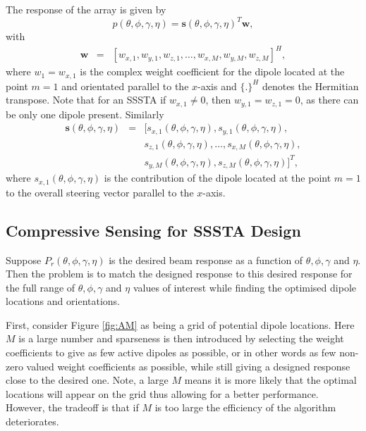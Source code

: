 \documentclass[10pt,final]{IEEEtran}
\begin{document}
 The response of the array is given by
\begin{equation}\label{eq:p2}
  p(\theta,\phi,\gamma,\eta)=\textbf{s}(\theta,\phi,\gamma,\eta)^{T}\textbf{w},
\end{equation}
with
\begin{eqnarray}\label{eq:w1}
  \textbf{w} &=& [w_{x,1}, w_{y,1}, w_{z,1}, \ldots, w_{x,M}, w_{y,M}, w_{z,M} ]^{H},
\end{eqnarray}
where $w_{1}=w_{x,1}$ is the complex weight coefficient for the dipole located at the point $m=1$ and orientated parallel to the $x$-axis and $\{.\}^{H}$ denotes the Hermitian transpose.  Note that for an SSSTA if $w_{x,1}\neq0$, then $w_{y,1}=w_{z,1}=0$, as there can be only one dipole present.  Similarly
\begin{eqnarray}\label{eq:s1}\nonumber
  \textbf{s}(\theta,\phi,\gamma,\eta) &=& [s_{x,1}(\theta,\phi,\gamma,\eta),s_{y,1}(\theta,\phi,\gamma,\eta),\\ \nonumber && s_{z,1}(\theta,\phi,\gamma,\eta), \ldots, s_{x,M}(\theta,\phi,\gamma,\eta),\\ &&s_{y,M}(\theta,\phi,\gamma,\eta), s_{z,M}(\theta,\phi,\gamma,\eta)]^{T},
\end{eqnarray}
where
$s_{x,1}(\theta,\phi,\gamma,\eta)$ is the contribution of the dipole located at the point $m=1$ to the overall steering vector parallel to the $x$-axis.

\subsection{Compressive Sensing for SSSTA Design}\label{sub:CS}
Suppose  $P_{r}(\theta,\phi,\gamma,\eta)$ is the desired beam response as a function of  $\theta, \phi, \gamma$ and $\eta$. Then the problem is to match the designed response to this desired response for the
full range of $\theta, \phi, \gamma$ and $\eta$ values of interest while finding the
optimised dipole locations and orientations.

First, consider Figure \ref{fig:AM} as being
a grid of potential dipole locations.  Here $M$ is a large number and sparseness is then introduced by selecting the weight
coefficients to give as few active dipoles as possible, or in other words as few non-zero valued weight coefficients as possible,
while still giving a designed response close to the desired
one.  Note, a large $M$ means it is more likely that the optimal locations will appear on the grid thus allowing for a better performance.  However, the tradeoff is that if $M$ is too large the efficiency of the algorithm deteriorates.
\end{document}
